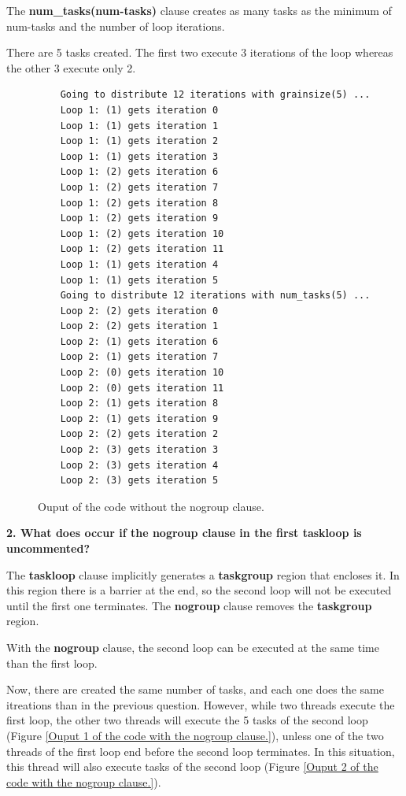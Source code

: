\documentclass[12pt, a4paper]{article}
\begin{document}
The \textbf{num\_tasks(num-tasks)} clause creates as many tasks as the minimum of num-tasks and the number of loop iterations.

There are 5 tasks created. The first two execute 3 iterations of the loop whereas the other 3 execute only 2.

\begin{figure}[H]
	\begin{lstlisting}
	Going to distribute 12 iterations with grainsize(5) ...
	Loop 1: (1) gets iteration 0
	Loop 1: (1) gets iteration 1
	Loop 1: (1) gets iteration 2
	Loop 1: (1) gets iteration 3
	Loop 1: (2) gets iteration 6
	Loop 1: (2) gets iteration 7
	Loop 1: (2) gets iteration 8
	Loop 1: (2) gets iteration 9
	Loop 1: (2) gets iteration 10
	Loop 1: (2) gets iteration 11
	Loop 1: (1) gets iteration 4
	Loop 1: (1) gets iteration 5
	Going to distribute 12 iterations with num_tasks(5) ...
	Loop 2: (2) gets iteration 0
	Loop 2: (2) gets iteration 1
	Loop 2: (1) gets iteration 6
	Loop 2: (1) gets iteration 7
	Loop 2: (0) gets iteration 10
	Loop 2: (0) gets iteration 11
	Loop 2: (1) gets iteration 8
	Loop 2: (1) gets iteration 9
	Loop 2: (2) gets iteration 2
	Loop 2: (3) gets iteration 3
	Loop 2: (3) gets iteration 4
	Loop 2: (3) gets iteration 5
	\end{lstlisting}
	
	\caption{Ouput of the code without the nogroup clause.}
\end{figure}

\hfill

\textbf{2. What does occur if the nogroup clause in the first taskloop is uncommented?}

The \textbf{taskloop} clause implicitly generates a \textbf{taskgroup} region that encloses it. In this region there is a barrier at the end, so the second loop will not be executed until the first one terminates. The \textbf{nogroup} clause removes the \textbf{taskgroup} region.

With the \textbf{nogroup} clause, the second loop can be executed at the same time than the first loop.

Now, there are created the same number of tasks, and each one does the same itreations than in the previous question. However, while two threads execute the first loop, the other two threads will execute the 5 tasks of the second loop (Figure \ref{Ouput 1 of the code with the nogroup clause.}), unless one of the two threads of the first loop end before the second loop terminates. In this situation, this thread will also execute tasks of the second loop (Figure \ref{Ouput 2 of the code with the nogroup clause.}).
\end{document}
